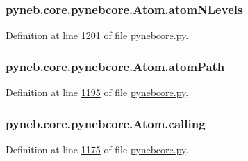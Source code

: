 \subsubsection[{atom\+N\+Levels}]{\setlength{\rightskip}{0pt plus 5cm}pyneb.\+core.\+pynebcore.\+Atom.\+atom\+N\+Levels}\label{classpyneb_1_1core_1_1pynebcore_1_1_atom_a16e5ede01345c370f0893b19ffb20c5c}


Definition at line \hyperlink{pynebcore_8py_source_l01201}{1201} of file \hyperlink{pynebcore_8py_source}{pynebcore.\+py}.

\hypertarget{classpyneb_1_1core_1_1pynebcore_1_1_atom_a8c2ddffd0cd3f7ce2a089e87746e909f}{}
\subsubsection[{atom\+Path}]{\setlength{\rightskip}{0pt plus 5cm}pyneb.\+core.\+pynebcore.\+Atom.\+atom\+Path}\label{classpyneb_1_1core_1_1pynebcore_1_1_atom_a8c2ddffd0cd3f7ce2a089e87746e909f}


Definition at line \hyperlink{pynebcore_8py_source_l01195}{1195} of file \hyperlink{pynebcore_8py_source}{pynebcore.\+py}.

\hypertarget{classpyneb_1_1core_1_1pynebcore_1_1_atom_a373b7735acf4f528b54bddf373ad67a1}{}
\subsubsection[{calling}]{\setlength{\rightskip}{0pt plus 5cm}pyneb.\+core.\+pynebcore.\+Atom.\+calling}\label{classpyneb_1_1core_1_1pynebcore_1_1_atom_a373b7735acf4f528b54bddf373ad67a1}


Definition at line \hyperlink{pynebcore_8py_source_l01175}{1175} of file \hyperlink{pynebcore_8py_source}{pynebcore.\+py}.




